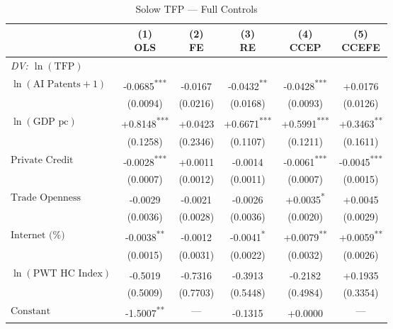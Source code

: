 \begin{table}[htbp]
\centering
\small
\caption{Solow TFP --- Full Controls}
\label{tab:tab_solow_full}
\begin{tabular}{lccccc}
\toprule
 & \makecell{(1)\\OLS} & \makecell{(2)\\FE} & \makecell{(3)\\RE} & \makecell{(4)\\CCEP} & \makecell{(5)\\CCEFE} \\
\midrule
\multicolumn{6}{l}{\textit{DV: $\ln(\text{TFP})$}} \\[4pt]
$\ln(\text{AI Patents}+1)$ & -0.0685\textsuperscript{***} & -0.0167\textsuperscript{} & -0.0432\textsuperscript{**} & -0.0428\textsuperscript{***} & +0.0176\textsuperscript{} \\
 & (0.0094) & (0.0216) & (0.0168) & (0.0093) & (0.0126) \\[2pt]
$\ln(\text{GDP pc})$ & +0.8148\textsuperscript{***} & +0.0423\textsuperscript{} & +0.6671\textsuperscript{***} & +0.5991\textsuperscript{***} & +0.3463\textsuperscript{**} \\
 & (0.1258) & (0.2346) & (0.1107) & (0.1211) & (0.1611) \\[2pt]
$\text{Private Credit}$ & -0.0028\textsuperscript{***} & +0.0011\textsuperscript{} & -0.0014\textsuperscript{} & -0.0061\textsuperscript{***} & -0.0045\textsuperscript{***} \\
 & (0.0007) & (0.0012) & (0.0011) & (0.0007) & (0.0015) \\[2pt]
$\text{Trade Openness}$ & -0.0029\textsuperscript{} & -0.0021\textsuperscript{} & -0.0026\textsuperscript{} & +0.0035\textsuperscript{*} & +0.0045\textsuperscript{} \\
 & (0.0036) & (0.0028) & (0.0036) & (0.0020) & (0.0029) \\[2pt]
$\text{Internet (\%)}$ & -0.0038\textsuperscript{**} & -0.0012\textsuperscript{} & -0.0041\textsuperscript{*} & +0.0079\textsuperscript{**} & +0.0059\textsuperscript{**} \\
 & (0.0015) & (0.0031) & (0.0022) & (0.0032) & (0.0026) \\[2pt]
$\ln(\text{PWT HC Index})$ & -0.5019\textsuperscript{} & -0.7316\textsuperscript{} & -0.3913\textsuperscript{} & -0.2182\textsuperscript{} & +0.1935\textsuperscript{} \\
 & (0.5009) & (0.7703) & (0.5448) & (0.4984) & (0.3354) \\[2pt]
$\text{Constant}$ & -1.5007\textsuperscript{**} & --- & -0.1315\textsuperscript{} & +0.0000\textsuperscript{} & --- \\

\end{tabular}
\end{table}
